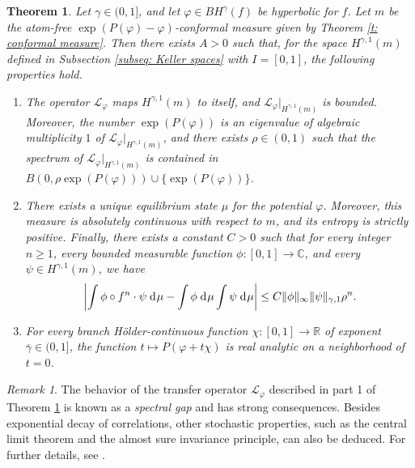 \documentclass[12pt]{amsart}
\numberwithin{equation}{section} %
\numberwithin{figure}{section} %
\theoremstyle{plain}
\newtheorem{theoalph}{Theorem}
\theoremstyle{definition}
\theoremstyle{remark}
\newtheorem{rema}[prop]{Remark}
\theoremstyle{citing}
\newcommand{\C}{\mathbb{C}}
\newcommand{\R}{\mathbb{R}}
\renewcommand{\=}{\coloneqq}
\newcommand{\dd}{\hspace{1pt}\operatorname{d}\hspace{-1pt}}
\begin{document}
\begin{theoalph}\label{general theo A}
Let $\gamma\in(0,1]$, and let $\varphi \in BH^{\gamma}(f)$ be hyperbolic for $f$. Let $m$ be the atom-free $\exp(P(\varphi)-\varphi)$-conformal measure given by Theorem \ref{t: conformal measure}. Then there exists $A>0$ such that, for the space $H^{\gamma,1}(m)$ defined in Subsection \ref{subseq: Keller spaces} with $I=[0,1]$, the following properties hold.
\begin{enumerate}
    \item[1.] The operator $\mathcal{L}_{\varphi}$ maps $H^{\gamma,1}(m)$ to itself, and $\mathcal{L}_{\varphi}|_{H^{\gamma,1}(m)}$ is bounded. Moreover, the number $\exp(P(\varphi))$ is an eigenvalue of algebraic multiplicity $1$ of $\mathcal{L}_{\varphi}|_{H^{\gamma,1}(m)}$, and there exists $\rho\in (0,1)$ such that the spectrum of $\mathcal{L}_{\varphi}|_{H^{\gamma,1}(m)}$ is contained in $B(0,\rho\exp(P(\varphi)))\cup \{\exp(P(\varphi))\}$.

    \item[2.] There exists a unique equilibrium state $\mu$ for the potential $\varphi$. Moreover, this measure is absolutely continuous with respect to $m$, and its entropy is strictly positive. Finally, there exists a constant $C>0$ such that for every integer $n\geq 1$, every bounded measurable function $\phi\colon[0,1]\to \C$, and every $\psi\in H^{\gamma,1}(m)$, we have
    \begin{equation}\label{eq exp decay}
        \left|\int \phi\circ f^n \cdot \psi \dd\mu-\int \phi \dd\mu \int \psi \dd\mu\right|
        \leq C\lVert \phi\rVert_{\infty} \lVert \psi \rVert_{\gamma,1} \rho^n.
    \end{equation}

    \item[3.] For every branch Hölder-continuous function $\chi\colon [0,1]\to \R$ of exponent $\overline{\gamma}\in (0,1]$, the function $t\mapsto P(\varphi +t \chi)$ is real analytic on a neighborhood of $t=0$.
\end{enumerate}
\end{theoalph}

\begin{rema}
The behavior of the transfer operator $\mathcal{L}_\varphi$ described in part 1 of Theorem \ref{general theo A} is known as a \emph{spectral gap} and has strong consequences. Besides exponential decay of correlations, other stochastic properties, such as the central limit theorem and the almost sure invariance principle, can also be deduced. For further details, see \cite[Theorem 3.3]{Keller1}.
\end{rema}
\end{document}
